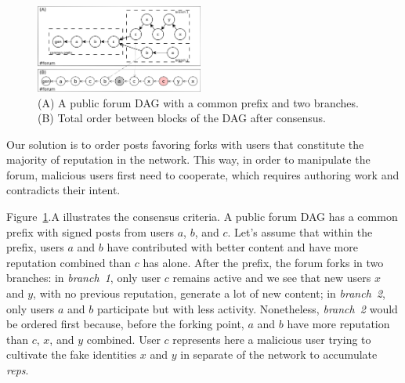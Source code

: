 \documentclass[10pt,journal,compsoc]{IEEEtran}
\newcommand{\reps}     {\emph{reps}\xspace}
\begin{document}
\begin{figure}
\centering
\includegraphics[width=0.49\textwidth]{reps2.png}
\caption{
    (A) A public forum DAG with a common prefix and two branches.
    (B) Total order between blocks of the DAG after consensus.
}
\label{fig.reps}
\end{figure}

Our solution is to order posts favoring forks with users that constitute the
majority of reputation in the network.
This way, in order to manipulate the forum, malicious users first need to
cooperate, which requires authoring work and contradicts their intent.

Figure~\ref{fig.reps}.A illustrates the consensus criteria.
A public forum DAG has a common prefix with signed posts from users $a$, $b$,
and $c$.
Let's assume that within the prefix, users $a$ and $b$ have contributed with
better content and have more reputation combined than $c$ has alone.
%
After the prefix, the forum forks in two branches:
in \emph{branch~1}, only user $c$ remains active and we see that new users $x$
and $y$, with no previous reputation, generate a lot of new content;
in \emph{branch~2}, only users $a$ and $b$ participate but with less activity.
Nonetheless, \emph{branch~2} would be ordered first because, before the forking
point, $a$ and $b$ have more reputation than $c$, $x$, and $y$ combined.
%
User $c$ represents here a malicious user trying to cultivate the fake
identities $x$ and $y$ in separate of the network to accumulate \reps.
\end{document}

